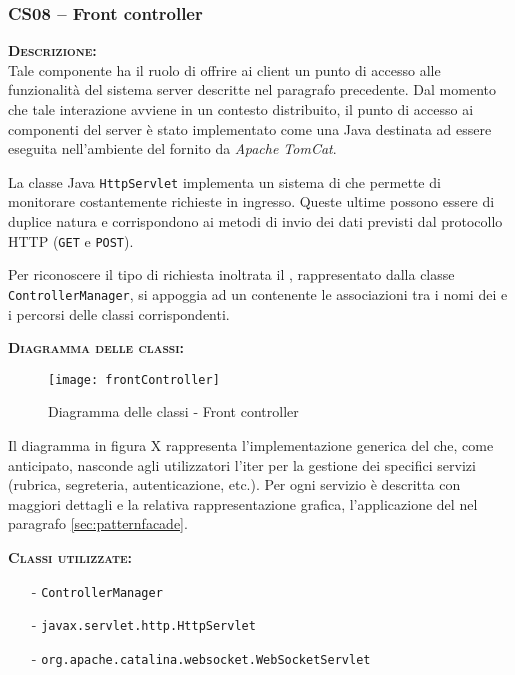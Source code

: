\subsubsection{CS08 -- Front controller}
\begin{description}
	\item{\scshape\bfseries Descrizione:}\\
Tale componente ha il ruolo di offrire ai client un punto di accesso alle funzionalità del sistema server descritte nel paragrafo precedente. Dal momento che tale interazione avviene in un contesto distribuito, il punto di accesso ai componenti del server è stato implementato come una  Java destinata ad essere eseguita nell'ambiente del  fornito da \textit{Apache TomCat}.

La classe Java \texttt{HttpServlet} implementa un sistema di  che permette di monitorare costantemente richieste in ingresso. Queste ultime possono essere di duplice natura e corrispondono ai metodi di invio dei dati previsti dal protocollo HTTP (\texttt{GET} e \texttt{POST}).

Per riconoscere il tipo di richiesta inoltrata il , rappresentato dalla classe \texttt{ControllerManager}, si appoggia ad un  contenente le associazioni tra i nomi dei  e i percorsi delle classi corrispondenti.

	\item{\scshape\bfseries Diagramma delle classi:}\\
\begin{figure}[H]
  \centering
  \texttt{[image: frontController]}
  \caption{Diagramma delle classi - Front controller}\label{fig:facadeserver}
\end{figure}

Il diagramma in figura X rappresenta l'implementazione generica del  che, come anticipato, nasconde agli utilizzatori l'iter per la gestione dei specifici servizi (rubrica, segreteria, autenticazione, etc.). Per ogni servizio è descritta con maggiori dettagli e la relativa rappresentazione grafica, l'applicazione del  nel paragrafo \vref{sec:patternfacade}.

\item{\scshape\bfseries Classi utilizzate:}\\
	\begin{itemize}[noitemsep,nolistsep]
	  \item[-] \texttt{ControllerManager}
	  \item[-] \texttt{javax.servlet.http.HttpServlet}
	  \item[-] \texttt{org.apache.catalina.websocket.WebSocketServlet}
	\end{itemize}

\end{description}
